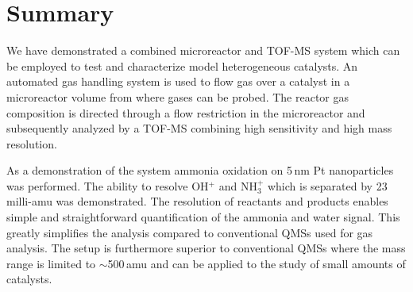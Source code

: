 \documentclass[aip,rsi]{revtex4-1}
\begin{document}

\section{Summary}
We have demonstrated a combined microreactor and TOF-MS system which can be employed to test and characterize model heterogeneous catalysts. An automated gas handling system is used to flow gas over a catalyst in a microreactor volume from where gases can be probed. The reactor gas composition is directed through a flow restriction in the microreactor and subsequently analyzed by a TOF-MS combining high sensitivity and high mass resolution.

As a demonstration of the system ammonia oxidation on 5\,nm Pt nanoparticles was performed. The ability to resolve OH$^{+}$ and NH$_3^+$ which is separated by 23\,milli-amu was demonstrated. The resolution of reactants and products enables simple and straightforward quantification of the ammonia and water signal. This greatly simplifies the analysis compared to conventional QMSs used for gas analysis. The setup is furthermore superior to conventional QMSs where the mass range is limited to $\sim$500\,amu and can be applied to the study of small amounts of catalysts.



%
%
\end{document}
